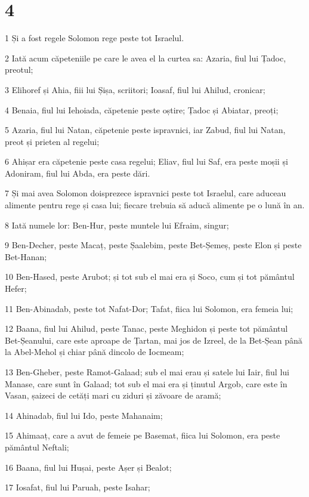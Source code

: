 \chapter{4}

\par 1 Și a fost regele Solomon rege peste tot Israelul.
\par 2 Iată acum căpeteniile pe care le avea el la curtea sa: Azaria, fiul lui Țadoc, preotul;
\par 3 Elihoref și Ahia, fiii lui Șișa, scriitori; Ioasaf, fiul lui Ahilud, cronicar;
\par 4 Benaia, fiul lui Iehoiada, căpetenie peste oștire; Țadoc și Abiatar, preoți;
\par 5 Azaria, fiul lui Natan, căpetenie peste ispravnici, iar Zabud, fiul lui Natan, preot și prieten al regelui;
\par 6 Ahișar era căpetenie peste casa regelui; Eliav, fiul lui Saf, era peste moșii și Adoniram, fiul lui Abda, era peste dări.
\par 7 Și mai avea Solomon doisprezece ispravnici peste tot Israelul, care aduceau alimente pentru rege și casa lui; fiecare trebuia să aducă alimente pe o lună în an.
\par 8 Iată numele lor: Ben-Hur, peste muntele lui Efraim, singur;
\par 9 Ben-Decher, peste Macaț, peste Șaalebim, peste Bet-Șemeș, peste Elon și peste Bet-Hanan;
\par 10 Ben-Hased, peste Arubot; și tot sub el mai era și Soco, cum și tot pământul Hefer;
\par 11 Ben-Abinadab, peste tot Nafat-Dor; Tafat, fiica lui Solomon, era femeia lui;
\par 12 Baana, fiul lui Ahilud, peste Tanac, peste Meghidon și peste tot pământul Bet-Șeanului, care este aproape de Țartan, mai jos de Izreel, de la Bet-Șean până la Abel-Mehol și chiar până dincolo de Iocmeam;
\par 13 Ben-Gheber, peste Ramot-Galaad; sub el mai erau și satele lui Iair, fiul lui Manase, care sunt în Galaad; tot sub el mai era și ținutul Argob, care este în Vasan, șaizeci de cetăți mari cu ziduri și zăvoare de aramă;
\par 14 Ahinadab, fiul lui Ido, peste Mahanaim;
\par 15 Ahimaaț, care a avut de femeie pe Basemat, fiica lui Solomon, era peste pământul Neftali;
\par 16 Baana, fiul lui Hușai, peste Așer și Bealot;
\par 17 Iosafat, fiul lui Paruah, peste Isahar;
